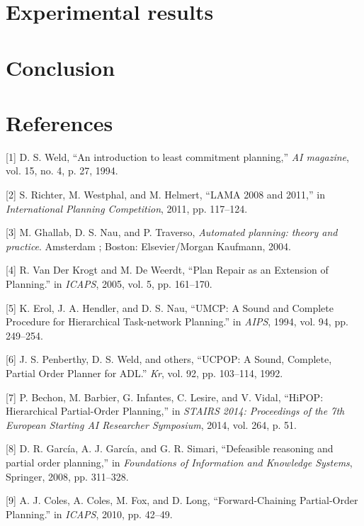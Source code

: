\documentclass[]{article}
\begin{document}
\section{Experimental results}\label{experimental-results}

\section*{Conclusion}\label{conclusion}

\section*{References}\label{references}

{[}1{]} D. S. Weld, ``An introduction to least commitment planning,''
\emph{AI magazine}, vol. 15, no. 4, p. 27, 1994.

{[}2{]} S. Richter, M. Westphal, and M. Helmert, ``LAMA 2008 and 2011,''
in \emph{International Planning Competition}, 2011, pp. 117--124.

{[}3{]} M. Ghallab, D. S. Nau, and P. Traverso, \emph{Automated
planning: theory and practice}. Amsterdam ; Boston: Elsevier/Morgan
Kaufmann, 2004.

{[}4{]} R. Van Der Krogt and M. De Weerdt, ``Plan Repair as an Extension
of Planning.'' in \emph{ICAPS}, 2005, vol. 5, pp. 161--170.

{[}5{]} K. Erol, J. A. Hendler, and D. S. Nau, ``UMCP: A Sound and
Complete Procedure for Hierarchical Task-network Planning.'' in
\emph{AIPS}, 1994, vol. 94, pp. 249--254.

{[}6{]} J. S. Penberthy, D. S. Weld, and others, ``UCPOP: A Sound,
Complete, Partial Order Planner for ADL.'' \emph{Kr}, vol. 92, pp.
103--114, 1992.

{[}7{]} P. Bechon, M. Barbier, G. Infantes, C. Lesire, and V. Vidal,
``HiPOP: Hierarchical Partial-Order Planning,'' in \emph{STAIRS 2014:
Proceedings of the 7th European Starting AI Researcher Symposium}, 2014,
vol. 264, p. 51.

{[}8{]} D. R. García, A. J. García, and G. R. Simari, ``Defeasible
reasoning and partial order planning,'' in \emph{Foundations of
Information and Knowledge Systems}, Springer, 2008, pp. 311--328.

{[}9{]} A. J. Coles, A. Coles, M. Fox, and D. Long, ``Forward-Chaining
Partial-Order Planning.'' in \emph{ICAPS}, 2010, pp. 42--49.
\end{document}
